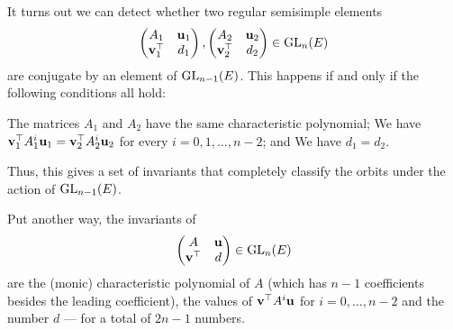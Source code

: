 \begin{remark}
  It turns out we can detect whether two regular semisimple elements
  \[
    \begin{pmatrix} A_1 & \mathbf u_1 \\ \mathbf v_1^\top & d_1 \end{pmatrix},
    \begin{pmatrix} A_2 & \mathbf u_2 \\ \mathbf v_2^\top & d_2 \end{pmatrix}
    \in \operatorname{GL}_{n}(E)
  \]
  are conjugate by an element of $\operatorname{GL}_{n-1}(E)$.
  This happens if and only if the following conditions all hold:
  \begin{itemize}
    \ii The matrices $A_1$ and $A_2$ have the same characteristic polynomial;
    \ii We have $\mathbf v_1^\top A_1^i \mathbf u_1 = \mathbf v_2^\top A_2^i \mathbf u_2$
    for every $i = 0, 1, \dots, n-2$; and
    \ii We have $d_1 = d_2$.
  \end{itemize}
  Thus, this gives a set of invariants that completely classify the orbits
  under the action of $\operatorname{GL}_{n-1}(E)$.

  Put another way, the invariants of
  \[ \begin{pmatrix} A & \mathbf u \\ \mathbf v^\top & d \end{pmatrix} \in \operatorname{GL}_n(E) \]
  are the (monic) characteristic polynomial of $A$
  (which has $n-1$ coefficients besides the leading coefficient),
  the values of $\mathbf v^\top A^i \mathbf u$ for $i = 0, \dots, n-2$
  and the number $d$ --- for a total of $2n-1$ numbers.
  \label{rem:invariants}
\end{remark}

